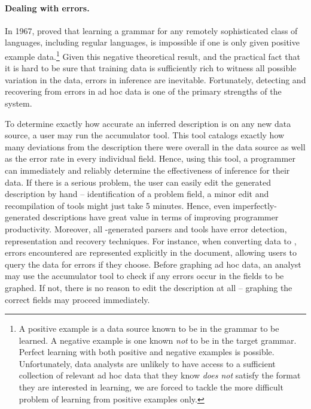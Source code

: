 
\paragraph*{Dealing with errors.}  
In 1967, \citet{gold:inference}
proved that learning a grammar for any remotely
sophisticated class of languages, including regular languages, 
is impossible if one is only given positive 
example data.\footnote{A positive example is a data source
known to be in the grammar to be learned.  
A negative example is one known {\em not} to be in the target grammar.
Perfect learning with both positive and negative examples is possible.
Unfortunately, data analysts are unlikely to have access to a
sufficient collection of relevant ad hoc data that they know {\em does not} 
satisfy the format they are interested in learning,
we are forced to tackle the more difficult problem of learning from 
positive examples only.}
Given this negative theoretical result, and the practical fact
that it is hard to be sure that training data
is sufficiently rich to witness all possible variation in the data,
errors in inference are inevitable.  Fortunately, detecting
and recovering from errors in ad hoc data is one of the primary strengths
of the \pads{} system.  

To determine exactly how accurate an
inferred description is on any new data source, a user may run the
accumulator tool.  This tool catalogs exactly how many deviations
from the description there were overall in the data source
as well as the error rate in every individual field.
Hence, using this tool, a programmer can immediately and reliably
determine the effectiveness of inference for their data.
If there is a serious 
problem, the user can easily edit the generated description by hand
-- identification of a problem field, a minor
edit and recompilation of tools might just take 5 minutes.  Hence,
even imperfectly-generated descriptions have great value in terms of
improving programmer productivity.  Moreover, all \pads{}-generated 
parsers and tools
have error detection, representation and recovery techniques.
For instance, when converting data to \xml{}, errors encountered
are represented explicitly in the \xml{} document, allowing users to query
the data for errors if they choose.  Before graphing ad hoc data,
an analyst may use the accumulator tool to check if any errors occur
in the fields to be graphed.  If not, there is no reason to edit
the description at all -- graphing the correct fields may proceed 
immediately.

